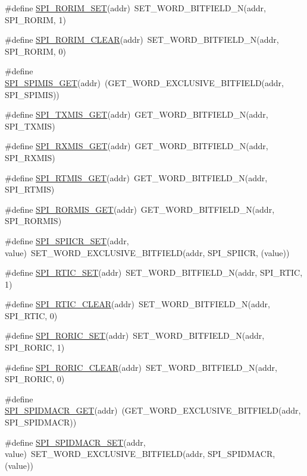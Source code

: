 \begin{DoxyCompactItemize}
\item 
\#define \hyperlink{a00572_afd7ffbcce51b6de99d74a39627f8a20a}{SPI\_\-RORIM\_\-SET}(addr)~SET\_\-WORD\_\-BITFIELD\_\-N(addr, SPI\_\-RORIM, 1)
\item 
\#define \hyperlink{a00572_a070788574532a6945678aefe98d62317}{SPI\_\-RORIM\_\-CLEAR}(addr)~SET\_\-WORD\_\-BITFIELD\_\-N(addr, SPI\_\-RORIM, 0)
\item 
\#define \hyperlink{a00572_a63a3a1551d2265d1c248d10fa459daa5}{SPI\_\-SPIMIS\_\-GET}(addr)~(GET\_\-WORD\_\-EXCLUSIVE\_\-BITFIELD(addr, SPI\_\-SPIMIS))
\item 
\#define \hyperlink{a00572_a5604bb7475f5d4d9beadc96044c710fd}{SPI\_\-TXMIS\_\-GET}(addr)~GET\_\-WORD\_\-BITFIELD\_\-N(addr, SPI\_\-TXMIS)
\item 
\#define \hyperlink{a00572_af68158a292ab4d08ce29a4f19fc13c8c}{SPI\_\-RXMIS\_\-GET}(addr)~GET\_\-WORD\_\-BITFIELD\_\-N(addr, SPI\_\-RXMIS)
\item 
\#define \hyperlink{a00572_a490a1a2b1541d94cc89c6c5e3f933803}{SPI\_\-RTMIS\_\-GET}(addr)~GET\_\-WORD\_\-BITFIELD\_\-N(addr, SPI\_\-RTMIS)
\item 
\#define \hyperlink{a00572_a68825adfaa2466e9176d78499a45ad4b}{SPI\_\-RORMIS\_\-GET}(addr)~GET\_\-WORD\_\-BITFIELD\_\-N(addr, SPI\_\-RORMIS)
\item 
\#define \hyperlink{a00572_a89ca3ed354ce8d6dad7a5b4effdb2db4}{SPI\_\-SPIICR\_\-SET}(addr, value)~SET\_\-WORD\_\-EXCLUSIVE\_\-BITFIELD(addr, SPI\_\-SPIICR, (value))
\item 
\#define \hyperlink{a00572_a69b8516777646f18c9e9d91a8dfa73f2}{SPI\_\-RTIC\_\-SET}(addr)~SET\_\-WORD\_\-BITFIELD\_\-N(addr, SPI\_\-RTIC, 1)
\item 
\#define \hyperlink{a00572_a81320baaebb8ba7261cd8c81b7fa716f}{SPI\_\-RTIC\_\-CLEAR}(addr)~SET\_\-WORD\_\-BITFIELD\_\-N(addr, SPI\_\-RTIC, 0)
\item 
\#define \hyperlink{a00572_ab748face9c1fca49bdbd1fc7f923fb50}{SPI\_\-RORIC\_\-SET}(addr)~SET\_\-WORD\_\-BITFIELD\_\-N(addr, SPI\_\-RORIC, 1)
\item 
\#define \hyperlink{a00572_a488a98012835ce03eb8d2e59e04ae4b0}{SPI\_\-RORIC\_\-CLEAR}(addr)~SET\_\-WORD\_\-BITFIELD\_\-N(addr, SPI\_\-RORIC, 0)
\item 
\#define \hyperlink{a00572_a565208794e40a6a110acfba8723549b8}{SPI\_\-SPIDMACR\_\-GET}(addr)~(GET\_\-WORD\_\-EXCLUSIVE\_\-BITFIELD(addr, SPI\_\-SPIDMACR))
\item 
\#define \hyperlink{a00572_aa59a5106f1f366b2cbf5d1b9f2c19b1b}{SPI\_\-SPIDMACR\_\-SET}(addr, value)~SET\_\-WORD\_\-EXCLUSIVE\_\-BITFIELD(addr, SPI\_\-SPIDMACR, (value))

\end{DoxyCompactItemize}
